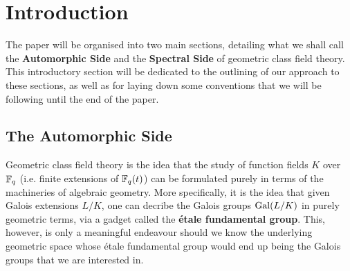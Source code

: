 \section{Introduction}
    The paper will be organised into two main sections, detailing what we shall call the \textbf{Automorphic Side} and the \textbf{Spectral Side} of geometric class field theory. This introductory section will be dedicated to the outlining of our approach to these sections, as well as for laying down some conventions that we will be following until the end of the paper.

    \subsection{The Automorphic Side}
        Geometric class field theory is the idea that the study of function fields $K$ over $\mathbb{F}_q$ (i.e. finite extensions of $\mathbb{F}_q(t)$) can be formulated purely in terms of the machineries of algebraic geometry. More specifically, it is the idea that given Galois extensions $L/K$, one can decribe the Galois groups $\mathrm{Gal}(L/K)$ in purely geometric terms, via a gadget called the \textbf{\'etale fundamental group}. This, however, is only a meaningful endeavour should we know the underlying geometric space whose \'etale fundamental group would end up being the Galois groups that we are interested in.
        
